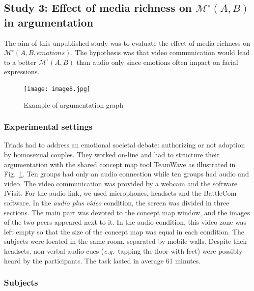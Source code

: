 \documentclass[natbib]{svjour3}
\newcommand{\eg}{{\textit{e.g.\ }}}
\newcommand{\Model}[3]{{$\mathcal{M}^{\circ}(#1, #2, #3)$}}
\newcommand{\gModel}[2]{{$\mathcal{M}^{\circ}(#1, #2)$}}
\begin{document}
\subsection{{\bf Study 3}:  Effect of media richness on \gModel{A}{B} in argumentation}

%
The aim of this unpublished study was to evaluate the effect of media richness
on \Model{A}{B}{emotions}.  The hypothesis was that video communication would
lead to a better \gModel{A}{B} than audio only since emotions often impact on
facial expressions.

\begin{figure}[ht!]
        \centering
        \texttt{[image: image8.jpg]}
        \caption{Example of argumentation graph}
        \label{study3:argumentation_graph}
\end{figure}


\subsubsection*{Experimental settings} 

Triads had to address an emotional societal debate: authorizing or not adoption
by homosexual couples. They worked on-line and had to structure their
argumentation with the shared concept map tool {\sc TeamWave} as illustrated in
Fig.~\ref{study3:argumentation_graph}. Ten groups had only an audio connection
while ten groups had audio and video. The video communication was provided by a
webcam and the software {\sc IVisit}. For the audio link, we used microphones,
headsets and the {\sc BattleCom} software. In the \emph{audio plus video}
condition, the screen was divided in three sections. The main part was devoted
to the concept map window, and the images of the two peers appeared next to it.
In the audio condition, this video zone was left empty so that the size of the
concept map was equal in each condition. The subjects were located in the same
room, separated by mobile walls. Despite their headsets, non-verbal audio cues
(\eg tapping the floor with feet) were possibly heard by the participants. The
task lasted in average 61 minutes.

\subsubsection*{Subjects}
\end{document}
